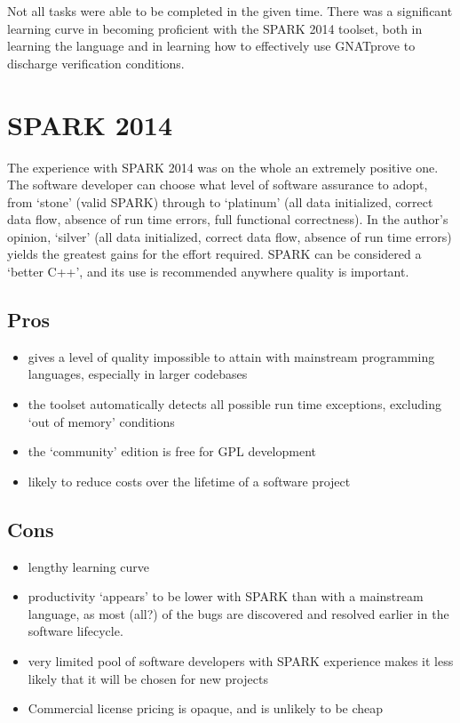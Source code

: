 \documentclass[12pt,openany,a4paper]{book}
\begin{document}
Not all tasks were able to be completed in the given time. There was a significant learning curve in becoming proficient with the SPARK 2014 toolset, both in learning the language and in learning how to effectively use GNATprove to discharge verification conditions.

\section{SPARK 2014}
The experience with SPARK 2014 was on the whole an extremely positive one. The software developer can choose what level of software assurance to adopt, from `stone' (valid SPARK) through to `platinum' (all data initialized, correct data flow, absence of run time errors,  full functional correctness). In the author's opinion, `silver' (all data initialized, correct data flow, absence of run time errors) yields the greatest gains for the effort required. SPARK can be considered a `better C++', and its use is recommended anywhere quality is important.

\subsection {Pros}
\begin{itemize}
\item gives a level of quality impossible to attain with mainstream programming languages, especially in larger codebases
\item the toolset automatically detects all possible run time exceptions, excluding `out of memory' conditions
\item the `community' edition is free for GPL development
\item likely to reduce costs over the lifetime of a software project
\end{itemize}

\subsection {Cons}
\begin{itemize}
\item lengthy learning curve
\item productivity `appears' to be lower with SPARK than with a mainstream language, as most (all?) of the bugs are discovered and resolved earlier in the software lifecycle. 
\item very limited pool of software developers with SPARK experience makes it less likely that it will be chosen for new projects
\item Commercial license pricing is opaque, and is unlikely to be cheap
\end{itemize}
\end{document}
